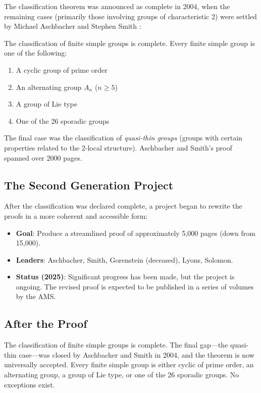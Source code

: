 The classification theorem was announced as complete in 2004, when the remaining cases (primarily those involving groups of characteristic 2) were settled by Michael Aschbacher and Stephen Smith \cite{aschbacher2004}:

\begin{theorem}
The classification of finite simple groups is complete. Every finite simple group is one of the following:
\begin{enumerate}
\item A cyclic group of prime order
\item An alternating group $A_n$ ($n \geq 5$)
\item A group of Lie type
\item One of the 26 sporadic groups
\end{enumerate}
\end{theorem}

The final case was the classification of \emph{quasi-thin groups} (groups with certain properties related to the 2-local structure). Aschbacher and Smith's proof spanned over 2000 pages.

\subsection{The Second Generation Project}

After the classification was declared complete, a project began to rewrite the proofs in a more coherent and accessible form:

\begin{itemize}
\item \textbf{Goal}: Produce a streamlined proof of approximately 5,000 pages (down from 15,000).
\item \textbf{Leaders}: Aschbacher, Smith, Gorenstein (deceased), Lyons, Solomon.
\item \textbf{Status (2025)}: Significant progress has been made, but the project is ongoing. The revised proof is expected to be published in a series of volumes by the AMS.
\end{itemize}

\subsection{After the Proof}

The classification of finite simple groups is complete. The final gap---the quasi-thin case---was closed by Aschbacher and Smith in 2004, and the theorem is now universally accepted. Every finite simple group is either cyclic of prime order, an alternating group, a group of Lie type, or one of the 26 sporadic groups. No exceptions exist.

